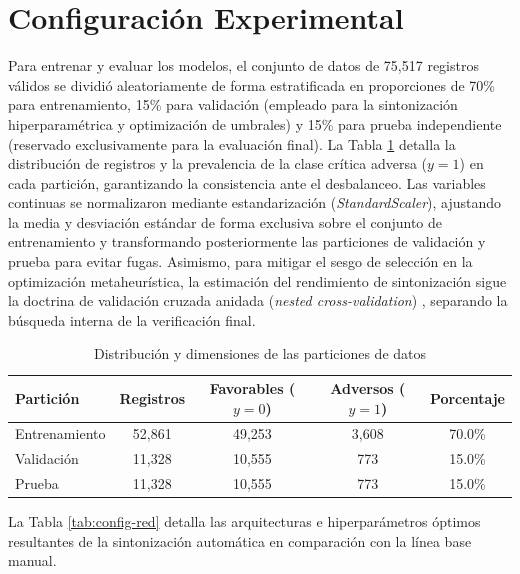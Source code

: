 \documentclass[conference]{IEEEtran}
\begin{document}
\section{Configuración Experimental}
Para entrenar y evaluar los modelos, el conjunto de datos de 75,517 registros válidos se dividió aleatoriamente de forma estratificada en proporciones de 70\% para entrenamiento, 15\% para validación (empleado para la sintonización hiperparamétrica y optimización de umbrales) y 15\% para prueba independiente (reservado exclusivamente para la evaluación final). La Tabla \ref{tab:particiones} detalla la distribución de registros y la prevalencia de la clase crítica adversa ($y=1$) en cada partición, garantizando la consistencia ante el desbalanceo. Las variables continuas se normalizaron mediante estandarización (\textit{StandardScaler}), ajustando la media y desviación estándar de forma exclusiva sobre el conjunto de entrenamiento y transformando posteriormente las particiones de validación y prueba para evitar fugas. Asimismo, para mitigar el sesgo de selección en la optimización metaheurística, la estimación del rendimiento de sintonización sigue la doctrina de validación cruzada anidada (\textit{nested cross-validation}) \cite{cawley2010overfitting}, separando la búsqueda interna de la verificación final.

\begin{table}[htbp]
\caption{Distribución y dimensiones de las particiones de datos}
\label{tab:particiones}
\centering
\scriptsize
\begin{tabular}{lcccc}
\toprule
\textbf{Partición} & \textbf{Registros} & \textbf{Favorables ($y=0$)} & \textbf{Adversos ($y=1$)} & \textbf{Porcentaje} \\
\midrule
Entrenamiento & 52,861 & 49,253 & 3,608 & 70.0\% \\
Validación & 11,328 & 10,555 & 773 & 15.0\% \\
Prueba & 11,328 & 10,555 & 773 & 15.0\% \\
\bottomrule
\end{tabular}
\end{table}

La Tabla \ref{tab:config-red} detalla las arquitecturas e hiperparámetros óptimos resultantes de la sintonización automática en comparación con la línea base manual.
\end{document}
